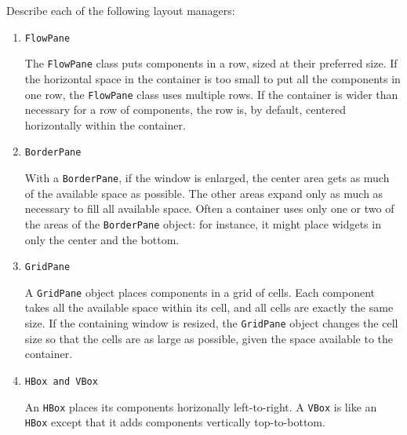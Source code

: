 Describe each of the following layout managers:
\begin{enumerate}

\item \texttt{FlowPane}
\begin{answer}
The \texttt{FlowPane} class puts components in a row, sized at their preferred size. If the horizontal space in the container is too small to put all the components in one row, the \texttt{FlowPane} class uses multiple rows. If the container is wider than necessary for a row of components, the row is, by default, centered horizontally within the container. \end{answer}

\item \texttt{BorderPane}
\begin{answer}
With a \texttt{BorderPane}, if the window is enlarged, the center area gets as much of the available space as possible. The other areas expand only as much as necessary to fill all available space. Often a container uses only one or two of the areas of the \texttt{BorderPane} object: for instance, it might place widgets in only the center and the bottom. \end{answer}

\item \texttt{GridPane}
\begin{answer}
A \texttt{GridPane} object places components in a grid of cells. Each component takes all the available space within its cell, and all cells are exactly the same size. If the containing window is resized, the \texttt{GridPane} object changes the cell size so that the cells are as large as possible, given the space available to the container.\end{answer}

\item \texttt{HBox and VBox}
\begin{answer}
An \texttt{HBox} places its components horizonally left-to-right.
A \texttt{VBox} is like an \texttt{HBox} except that it adds components vertically top-to-bottom.
\end{answer}

\end{enumerate}

\vspace{24pt}
